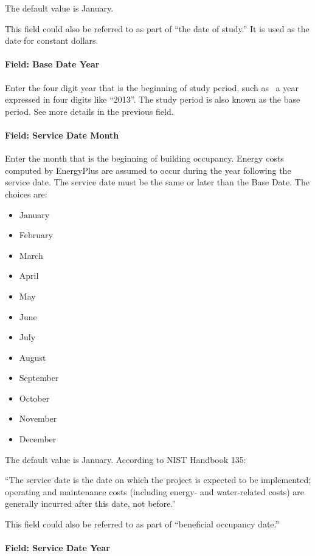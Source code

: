 The default value is January.

This field could also be referred to as part of ``the date of study.'' It is used as the date for constant dollars.

\paragraph{Field: Base Date Year}\label{field-base-date-year}

Enter the four digit year that is the beginning of study period, such as~ a year expressed in four digits like ``2013''. The study period is also known as the base period. See more details in the previous field.

\paragraph{Field: Service Date Month}\label{field-service-date-month}

Enter the month that is the beginning of building occupancy. Energy costs computed by EnergyPlus are assumed to occur during the year following the service date. The service date must be the same or later than the Base Date. The choices are:

\begin{itemize}
\item
  January
\item
  February
\item
  March
\item
  April
\item
  May
\item
  June
\item
  July
\item
  August
\item
  September
\item
  October
\item
  November
\item
  December
\end{itemize}

The default value is January. According to NIST Handbook 135:

``The service date is the date on which the project is expected to be implemented; operating and maintenance costs (including energy- and water-related costs) are generally incurred after this date, not before.''

This field could also be referred to as part of ``beneficial occupancy date.''

\paragraph{Field: Service Date Year}\label{field-service-date-year}

